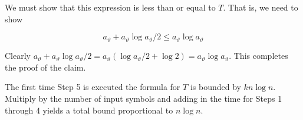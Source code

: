 We must show that this expression is less than or equal to $T$. That is, we need to show

\begin{displaymath}
a_{\vartheta} + a_{\vartheta} \log a_{\vartheta} / 2 \leq a_{\vartheta} \log a_{\vartheta}
\end{displaymath}

Clearly $a_{\vartheta} + a_{\vartheta} \log a_{\vartheta} / 2 = a_{\vartheta} (\log a_{\vartheta} / 2 + \log 2) = a_{\vartheta} \log a_{\vartheta}$.
This completes the proof of the claim.

The first time Step 5 is executed the formula for $T$ is bounded by $kn \log n$. Multiply by the number
of input symbols and adding in the time for Steps 1 through 4 yields a total bound proportional to $n \log n$.
